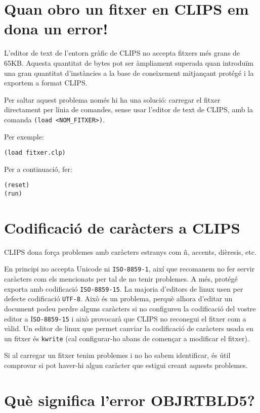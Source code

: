 \documentclass[11pt,svgnames]{scrbook}
\begin{document}
\section{Quan obro un fitxer en CLIPS em dona un error!}


L'editor de text de l'entorn gràfic de CLIPS no accepta fitxers més grans de
65KB. Aquesta quantitat de bytes pot ser àmpliament superada quan introduïm una
gran quantitat d'instàncies a la base de coneixement mitjançant protégé i la
exportem a format CLIPS.

Per saltar aquest problema només hi ha una solució: carregar el fitxer
directament per línia de comandes, sense usar l'editor de text de CLIPS, amb la
comanda \texttt{(load <NOM\_FITXER>)}.

Per exemple:

\begin{verbatim}
(load fitxer.clp)
\end{verbatim} 
Per a continuació, fer:

\begin{verbatim}
(reset)
(run)
\end{verbatim} 


\section{Codificació de caràcters a CLIPS}


CLIPS dona força problemes amb caràcters estranys com ñ, accents, dièresis,
etc.

En principi no accepta Unicode ni \texttt{ISO-8859-1}, així que recomanem no fer
servir caràcters com els mencionats per tal de no tenir problemes. A més,
protégé exporta amb codificació \texttt{ISO-8859-15}. La majoria d'editors de
linux usen per defecte codificació \texttt{UTF-8}. Això és un problema, perquè
alhora d'editar un document podeu perdre alguns caràcters si no configureu la
codificació del vostre editor a I\texttt{SO-8859-15} i això provocarà que CLIPS
no reconegui el fitxer com a vàlid. Un editor de linux que permet canviar la
codificació de caràcters usada en un fitxer és \texttt{kwrite} (cal
configurar-ho abans de començar a modificar el fitxer).

Si al carregar un fitxer tenim problemes i no ho sabem identificar, és útil
comprovar si pot haver-hi algun caràcter que estigui creant aquests problemes.


\section{Què significa l'error OBJRTBLD5?}
\end{document}
